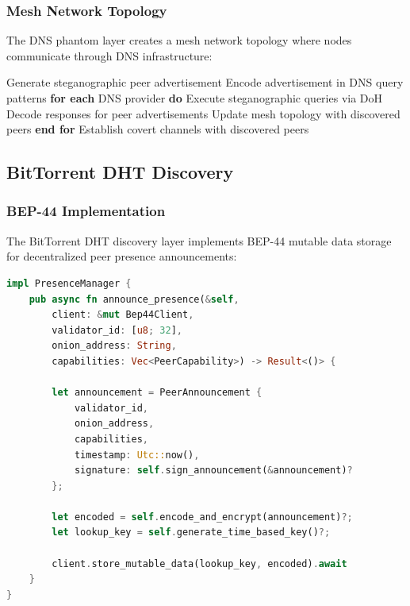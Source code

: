 \documentclass[11pt,a4paper]{article}
\theoremstyle{definition}
\theoremstyle{remark}
\begin{document}
\subsubsection{Mesh Network Topology}

The DNS phantom layer creates a mesh network topology where nodes communicate through DNS infrastructure:

\begin{algorithm}
\caption{DNS Phantom Mesh Discovery}
\begin{algorithmic}[1]
\STATE Generate steganographic peer advertisement
\STATE Encode advertisement in DNS query patterns
\STATE \textbf{for each} DNS provider \textbf{do}
    \STATE Execute steganographic queries via DoH
    \STATE Decode responses for peer advertisements
    \STATE Update mesh topology with discovered peers
\STATE \textbf{end for}
\STATE Establish covert channels with discovered peers
\end{algorithmic}
\end{algorithm}

\subsection{BitTorrent DHT Discovery}

\subsubsection{BEP-44 Implementation}

The BitTorrent DHT discovery layer implements BEP-44 mutable data storage for decentralized peer presence announcements:

\begin{lstlisting}[language=Rust, caption=BEP-44 Presence Announcement]
impl PresenceManager {
    pub async fn announce_presence(&self, 
        client: &mut Bep44Client,
        validator_id: [u8; 32],
        onion_address: String,
        capabilities: Vec<PeerCapability>) -> Result<()> {
        
        let announcement = PeerAnnouncement {
            validator_id,
            onion_address,
            capabilities,
            timestamp: Utc::now(),
            signature: self.sign_announcement(&announcement)?
        };
        
        let encoded = self.encode_and_encrypt(announcement)?;
        let lookup_key = self.generate_time_based_key()?;
        
        client.store_mutable_data(lookup_key, encoded).await
    }
}
\end{lstlisting}
\end{document}
